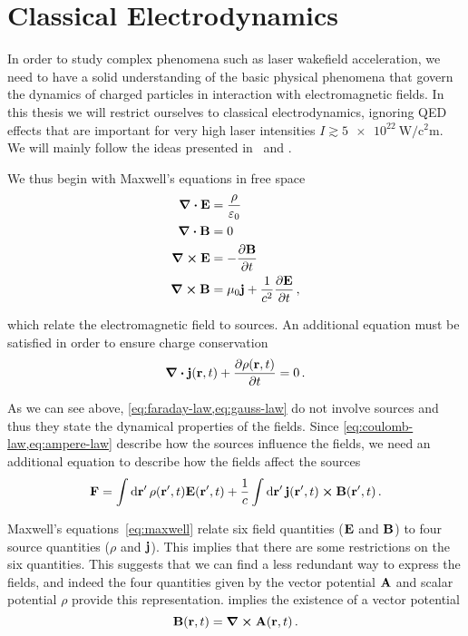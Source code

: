 \documentclass[12pt, class=report, crop=false]{standalone}
\begin{document}
\chapter{Classical Electrodynamics}%
\label{chap:classical-electrodynamics}

In order to study complex phenomena such as laser wakefield acceleration,
we need to have a solid understanding of the basic physical phenomena
that govern the dynamics of charged particles in interaction
with electromagnetic fields. In this thesis we will restrict ourselves to
classical electrodynamics, ignoring QED effects that are important
for very high laser intensities \(I \gtrsim \SI{5e22}{\watt\per\square\centi\metre}\).
We will mainly follow the ideas presented in~\textcite{jackson_classicalelectrodynamics_1999} and \textcite[Chapter 2]{eisenberg_nucleartheory_1978}.

We thus begin with Maxwell's equations in free space
\begin{subequations}%
  \label{eq:maxwell}
  \begin{align}
    \div{\vb{E}} & = \frac{\rho}{\varepsilon_0} \label{eq:coulomb-law} \\
    \div{\vb{B}} & = 0 \label{eq:gauss-law} \\
    \curl{\vb{E}} & = - \pdv{\vb{B}}{t} \label{eq:faraday-law} \\
    \curl{\vb{B}} & = \mu_0 \vb{j} + \frac{1}{c^2} \pdv{\vb{E}}{t} \,, \label{eq:ampere-law}
  \end{align}
\end{subequations}

which relate the electromagnetic field to sources. An additional
equation must be satisfied in order to ensure charge conservation
\begin{equation}
  \label{eq:continuity-equation}
  \div{\vb{j}(\vb{r}, t)} + \pdv{\rho(\vb{r}, t)}{t} = 0 \,.
\end{equation}

As we can see above, \cref{eq:faraday-law,eq:gauss-law}
do not involve sources and thus they state the dynamical properties of the fields.
Since \cref{eq:coulomb-law,eq:ampere-law} describe how
the sources influence the fields, we need an additional equation to describe how
the fields affect the sources
\[
  \vb{F} = \int \dd{\vb{r}'} \rho(\vb{r}', t) \vb{E}(\vb{r}', t) +
           \frac{1}{c} \int \dd{\vb{r}'} \vb{j}(\vb{r}', t) \cross \vb{B}(\vb{r}', t)\,.
\]

Maxwell's equations~\eqref{eq:maxwell} relate six field quantities (\(\vb{E}\) and \(\vb{B}\))
to four source quantities (\(\rho\) and \(\vb{j}\)). This implies that there are some
restrictions on the six quantities. This suggests that we can find a less redundant
way to express the fields, and indeed the four quantities given by the
vector potential \(\vb{A}\) and scalar potential \(\rho\) provide this representation.
 implies the existence of a vector potential
\begin{equation}
  \label{eq:vector-potential}
  \vb{B}(\vb{r}, t) = \curl{\vb{A}(\vb{r}, t)}\,.
\end{equation}
\end{document}
